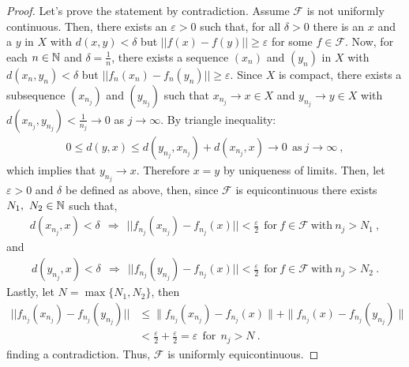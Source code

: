 \begin{questions}


\begin{solution}
  \begin{proof}
  Let's prove the statement by contradiction. Assume $\mathcal{F}$ is not uniformly continuous. Then, there exists an $\varepsilon >0$ such that, for all $\delta >0$ there is an $x$ and a $y$ in $X$ with $d(x,y)<\delta$ but $||f(x)-f(y)||\geq\varepsilon$ for some $f\in\mathcal{F}$. Now, for each $n\in\mathbb{N}$ and $\delta=\frac{1}{n}$, there exists a sequence $(x_n)$ and $(y_n)$ in $X$ with $d(x_n,y_n)<\delta$ but $||f_n(x_n)-f_n(y_n)||\geq\varepsilon$. Since $X$ is compact, there exists a subsequence $(x_{n_j})$ and $(y_{n_j})$ such that $x_{n_j}\rightarrow x\in X$ and $y_{n_j}\rightarrow y\in X$ with $d(x_{n_j},y_{n_j})<\frac{1}{n_j}\rightarrow 0$ as $j \rightarrow\infty$. By triangle inequality:
  \begin{align*}
  0\leq d(y,x)\leq d(y_{n_j},x_{n_j})+d(x_{n_j},x)\rightarrow 0~~\text{as}~j \rightarrow \infty~,
  \end{align*}
  which implies that $y_{n_j}\rightarrow x$. Therefore $x=y$ by uniqueness of limits. Then, let $\varepsilon > 0$ and $\delta$ be defined as above, then, since $\mathcal{F}$ is equicontinuous there exists $N_1,~N_2 \in \mathbb{N}$ such that, 
  \begin{align*}
  d(x_{n_j},x) < \delta ~~\Rightarrow~~||f_{n_j}(x_{n_j})-f_{n_j}(x)|| < \frac{\varepsilon}{2} ~~\text{for}~ f\in\mathcal{F}~\text{with}~n_j>N_1~,
  \end{align*}
and
    \begin{align*}
  d(y_{n_j},x) < \delta~~\Rightarrow~~||f_{n_j}(y_{n_j})-f_{n_j}(x)|| < \frac{\varepsilon}{2}~~\text{for}~ f\in\mathcal{F}~\text{with}~n_j>N_2~.
  \end{align*}
Lastly, let $N = \max\{N_1,N_2\}$, then 
\begin{align*}
||f_{n_j}(x_{n_j})-f_{n_j}(y_{n_j})|| &\leq \|f_{n_j}(x_{n_j})-f_{n_j}(x)\| + \|f_{n_j}(x) - f_{n_j}(y_{n_j})\| \\
&< \frac{\varepsilon}{2} + \frac{\varepsilon}{2} = \varepsilon~~\text{for} ~~n_j>N~.
\end{align*}
finding a contradiction. Thus, $\mathcal{F}$ is uniformly equicontinuous.
  \end{proof}
\end{solution}


\end{questions}